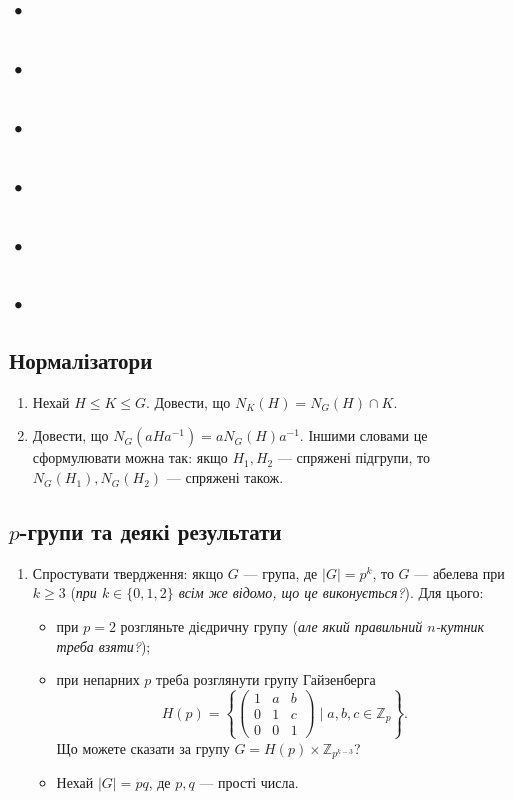 \documentclass{math_library}
\begin{document}
\subsection{•}
\subsection{•}
\subsection{•}
\subsection{•}
\subsection{•}
\subsection{•}
\subsection{Нормалізатори}
\begin{enumerate}[wide=0pt,label=\thesubsection.\arabic*]
\item Нехай $H \leq K \leq G$. Довести, що $N_K(H) = N_G(H) \cap K$.

\item Довести, що $N_G(aHa^{-1}) = aN_G(H)a^{-1}$. Іншими словами це сформулювати можна так: якщо $H_1,H_2$ --- спряжені підгрупи, то $N_G(H_1),N_G(H_2)$ --- спряжені також.
\end{enumerate}

\subsection{$p$-групи та деякі результати}
\begin{enumerate}[wide=0pt,label=\thesubsection.\arabic*]
\item Спростувати твердження: якщо $G$ --- група, де $|G| = p^k$, то $G$ --- абелева при $k \geq 3$ (\textit{при $k \in \{0,1,2\}$  всім же відомо, що це виконується?}). Для цього:
\begin{itemize}[wide=0pt]
\item при $p = 2$ розгляньте дієдричну групу (\textit{але який правильний $n$-кутник треба взяти?});
\item при непарних $p$ треба розглянути групу Гайзенберга
\[
H(p) = \left\{ \begin{pmatrix}
1 & a & b \\
0 & 1 & c \\
0 & 0 & 1
\end{pmatrix} \mid a,b,c \in \mathbb{Z}_p \right\}.
\]
Що можете сказати за групу $G = H(p) \times \mathbb{Z}_{p^{k-3}}$?

\item Нехай $|G| = pq$, де $p,q$ --- прості числа.
\end{itemize}
\end{enumerate}
\end{document}
